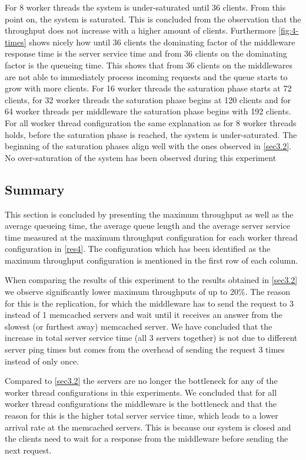 \documentclass[11pt,a4paper]{article}
\begin{document}
For 8 worker threads the system is under-saturated until 36 clients. From this point on, the system is saturated. This is concluded from the observation that the throughput does not increase with a higher amount of clients. Furthermore \autoref{fig:4-times} shows nicely how until 36 clients the dominating factor of the middleware response time is the server service time and from 36 clients on the dominating factor is the queueing time. This shows that from 36 clients on the middlewares are not able to immediately process incoming requests and the queue starts to grow with more clients.
For 16 worker threads the saturation phase starts at 72 clients, for 32 worker threads the saturation phase begins at 120 clients and for 64 worker threads per middleware the saturation phase begins with 192 clients. For all worker thread configuration the same explanation as for 8 worker threads holds, before the saturation phase is reached, the system is under-saturated. The beginning of the saturation phases align well with the ones observed in \autoref{sec3.2}.
No over-saturation of the system has been observed during this experiment

\subsection{Summary}
This section is concluded by presenting the maximum throughput as well as the average queueing time, the average queue length and the average server service time measured at the maximum throughput configuration for each worker thread configuration in \autoref{res4}. The configuration which has been identified as the maximum throughput configuration is mentioned in the first row of each column.

When comparing the results of this experiment to the results obtained in \autoref{sec3.2} we observe significantly lower maximum throughputs of up to 20\%. The reason for this is the replication, for which the middleware has to send the request to 3 instead of 1 memcached servers and wait until it receives an answer from the slowest (or furthest away) memcached server. We have concluded that the increase in total server service time (all 3 servers together) is not due to different server ping times but comes from the overhead of sending the request 3 times instead of only once.

Compared to \autoref{sec3.2} the servers are no longer the bottleneck for any of the worker thread configurations in this experiments. We concluded that for all worker thread configurations the middleware is the bottleneck and that the reason for this is the higher total server service time, which leads to a lower arrival rate at the memcached servers. This is because our system is closed and the clients need to wait for a response from the middleware before sending the next request.
\end{document}
